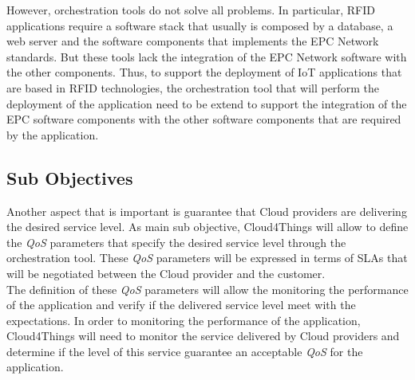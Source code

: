 However, orchestration tools do not solve all problems. In particular, RFID applications require a
software stack that usually is composed by a database, a web server and the software components
that implements the EPC Network standards. But these tools lack the integration of the EPC
Network software with the other components. Thus, to support the deployment of IoT applications
that are based in RFID technologies, the orchestration tool that will perform the deployment
of the application need to be extend to support the integration of the EPC software components
with the other software components that are required by the application.
\subsection{Sub Objectives}
\label{sub:sub_objectives}
Another aspect that is important is guarantee that Cloud providers are delivering
the desired service level. As main sub objective, Cloud4Things will allow to
define the \textit{QoS} parameters that specify the desired service level through
the orchestration tool. These \textit{QoS} parameters will be expressed in terms of
SLAs that will be negotiated between the Cloud provider and the customer.\\

The definition of these \textit{QoS} parameters will allow the monitoring the performance
of the application and verify if the delivered service level meet with the expectations.
In order to monitoring the performance of the application, Cloud4Things will need to
monitor the service delivered by Cloud providers and determine if the level of this
service guarantee an acceptable \textit{QoS} for the application.
